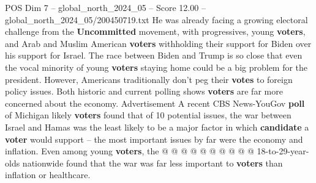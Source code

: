 \begin{textsample}{POS Dim 7 – global\_north\_2024\_05 – Score 12.00 – global\_north\_2024\_05/200450719.txt}
He was already facing a growing electoral challenge from the \textbf{Uncommitted} movement, with progressives, young \textbf{voters}, and Arab and Muslim American \textbf{voters} withholding their support for Biden over his support for Israel.
The race between Biden and Trump is so close that even the vocal minority of young \textbf{voters} staying home could be a big problem for the president.
However, Americans traditionally don't peg their \textbf{votes} to foreign policy issues.
Both historic and current polling shows \textbf{voters} are far more concerned about the economy.
Advertisement A recent CBS News-YouGov \textbf{poll} of Michigan likely \textbf{voters} found that of 10 potential issues, the war between Israel and Hamas was the least likely to be a major factor in which \textbf{candidate} a \textbf{voter} would support -- the most important issues by far were the economy and inflation.
Even among young \textbf{voters}, the @ @ @ @ @ @ @ @ @ @ 18-to-29-year-olds nationwide found that the war was far less important to \textbf{voters} than inflation or healthcare.

\end{textsample}
